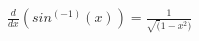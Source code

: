 \documentclass[preview]{standalone}
\begin{document}
\begin{center}
\( \frac{d}{dx}(sin^(-1)(x)) = \frac{1}{\sqrt(1 - x^2)} \)
\end{center}
\end{document}
